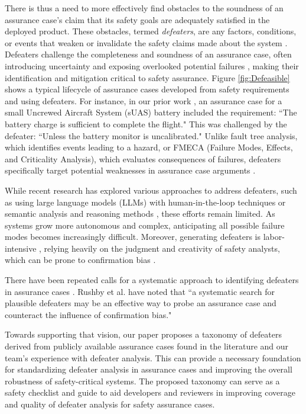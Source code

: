 There is thus a need to more effectively find obstacles \cite{jLamLet00} to the soundness of an assurance case's claim that its safety goals are adequately satisfied in the deployed product. These obstacles, termed \emph{defeaters}, are any factors, conditions, or events that weaken or invalidate the safety claims made about the system \cite{goodenough2015eliminative,gohar2024codefeater}. Defeaters challenge the completeness and soundness of an assurance case, often introducing uncertainty and exposing overlooked potential failures \cite{bloomfield2024defeaters}, making their identification and mitigation critical to safety assurance. 
Figure \ref{fig:Defeasible} shows a typical lifecycle of assurance cases developed from safety requirements and using defeaters. For instance, in our prior work \cite{gohar2024codefeater}, an assurance case for a small Uncrewed Aircraft System (sUAS) battery included the requirement: ``The battery charge is sufficient to complete the flight." This was challenged by the defeater: ``Unless the battery monitor is uncalibrated." Unlike fault tree analysis, which identifies events leading to a hazard, or FMECA (Failure Modes, Effects, and Criticality Analysis), which evaluates consequences of failures, defeaters specifically target potential weaknesses in assurance case arguments \cite{Knight12}.

While recent research has explored various approaches to address defeaters, such as using large language models (LLMs) with human-in-the-loop techniques \cite{gohar2024codefeater,AISupported} or semantic analysis and reasoning methods \cite{murugesan2023semantic,rushby2015understanding}, these efforts remain limited. As systems grow more autonomous and complex, anticipating all possible failure modes %
becomes increasingly difficult. Moreover, generating defeaters is labor-intensive \cite{AISupported}, relying heavily on the judgment and creativity of safety analysts, which can be prone to confirmation bias \cite{bloomfield2021safety,10311213}.  

There have been repeated calls for a systematic approach to identifying %
defeaters in assurance cases \cite{maksimov2019survey,bloomfield2021safety,rushby2015interpretation,bloomfield2024defeaters}. 
Rushby et al. \cite{rushby2015understanding} have noted that ``a systematic search for plausible defeaters may be an effective way to probe an assurance case and counteract the influence of confirmation bias." 

Towards supporting that vision, our paper proposes a taxonomy of defeaters derived from publicly available assurance cases found in the literature and our team's experience with defeater analysis. This can provide a necessary foundation for standardizing defeater analysis in assurance cases and improving the overall robustness of safety-critical systems. The proposed taxonomy can serve as a safety checklist and guide to aid developers and reviewers in improving coverage and quality of defeater analysis for safety assurance cases.

